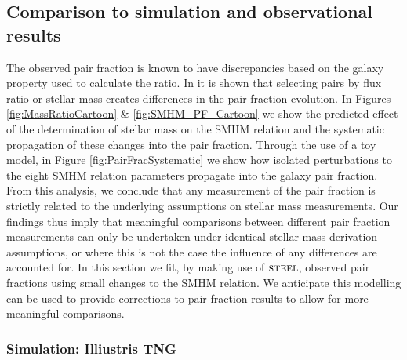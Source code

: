 \subsection{Comparison to simulation and observational results}
\label{subsec:SimObsRes}
The observed pair fraction is known to have discrepancies based on the galaxy property used to calculate the ratio. In \citet{Man2016RESOLVING03} it is shown that selecting pairs by flux ratio or stellar mass creates differences in the pair fraction evolution. 
In Figures \ref{fig:MassRatioCartoon} \& \ref{fig:SMHM_PF_Cartoon} we show the predicted effect of the determination of stellar mass on the SMHM relation and the systematic propagation of these changes into the pair fraction. 
Through the use of a toy model, in Figure \ref{fig:PairFracSystematic} we show how isolated perturbations to the eight SMHM relation parameters propagate into the galaxy pair fraction.
From this analysis, we conclude that any measurement of the pair fraction is strictly related to the underlying assumptions on stellar mass measurements. 
Our findings thus imply that meaningful comparisons between different pair fraction measurements can only be undertaken under identical stellar-mass derivation assumptions, or where this is not the case the influence of any differences are accounted for.
In this section we fit, by making use of $\textsc{steel}$, observed pair fractions using small changes to the SMHM relation.
We anticipate this modelling can be used to provide corrections to pair fraction results to allow for more meaningful comparisons.

\subsubsection{Simulation: Illiustris TNG}

